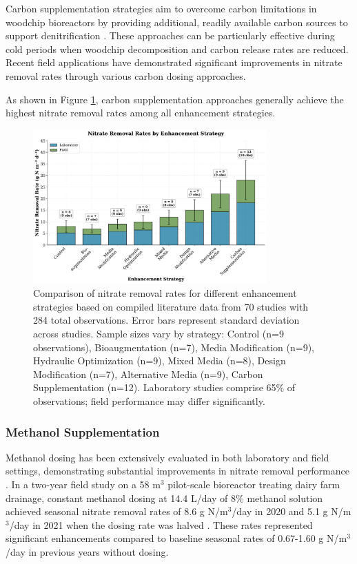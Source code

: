 \documentclass[12pt,a4paper]{article}
\begin{document}
Carbon supplementation strategies aim to overcome carbon limitations in woodchip bioreactors by providing additional, readily available carbon sources to support denitrification \citep{RN242, RN242}. These approaches can be particularly effective during cold periods when woodchip decomposition and carbon release rates are reduced. Recent field applications have demonstrated significant improvements in nitrate removal rates through various carbon dosing approaches.

As shown in Figure \ref{fig:removal_rates_by_strategy}, carbon supplementation approaches generally achieve the highest nitrate removal rates among all enhancement strategies.

\begin{figure}[ht]
\centering
\includegraphics[width=0.8\textwidth]{fig1_removal_rates_scientific}
\caption{Comparison of nitrate removal rates for different enhancement strategies based on compiled literature data from 70 studies with 284 total observations. Error bars represent standard deviation across studies. Sample sizes vary by strategy: Control (n=9 observations), Bioaugmentation (n=7), Media Modification (n=9), Hydraulic Optimization (n=9), Mixed Media (n=8), Design Modification (n=7), Alternative Media (n=9), Carbon Supplementation (n=12). Laboratory studies comprise 65\% of observations; field performance may differ significantly.}
\label{fig:removal_rates_by_strategy}
\end{figure}

\subsubsection{Methanol Supplementation}

Methanol dosing has been extensively evaluated in both laboratory and field settings, demonstrating substantial improvements in nitrate removal performance \citep{RN242}. In a two-year field study on a 58 m$^3$ pilot-scale bioreactor treating dairy farm drainage, constant methanol dosing at 14.4 L/day of 8\% methanol solution achieved seasonal nitrate removal rates of 8.6 g N/m$^3$/day in 2020 and 5.1 g N/m$^3$/day in 2021 when the dosing rate was halved \citep{RN242}. These rates represented significant enhancements compared to baseline seasonal rates of 0.67-1.60 g N/m$^3$/day in previous years without dosing.
\end{document}
